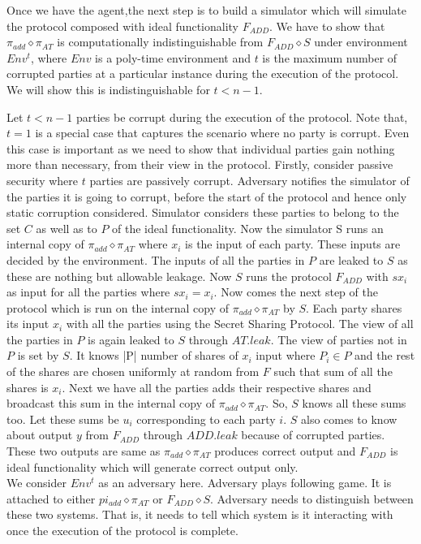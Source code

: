 \documentclass{llncs}
\begin{document}
Once we have the agent,the next step is to build a simulator which will simulate the protocol composed with ideal functionality $F_{ADD}$. We have to show that $\pi_{add} \diamond \pi_{AT}$ is computationally indistinguishable from $F_{ADD} \diamond S$ under environment $Env^t$, where $Env$ is a poly-time environment and $t$ is the maximum number of corrupted parties at a particular instance during the execution of the protocol. We will show this is indistinguishable for $t < n-1$. 

Let $t < n-1$ parties be corrupt during the execution of the protocol. Note that, $t=1$ is a special case that captures the scenario where no party is corrupt. Even this case is important as we need to show that individual parties gain nothing more than necessary, from their view in the protocol. Firstly, consider passive security where $t$ parties are passively corrupt. Adversary notifies the simulator of the parties it is going to corrupt, before the start of the protocol and hence only static corruption considered. Simulator considers these parties to belong to the set $C$ as well as to $P$ of the ideal functionality. Now the simulator S runs an internal copy of $\pi_{add} \diamond \pi_{AT}$ where $x_i$ is the input of each party. These inputs are decided by the environment. The inputs of all the parties in $P$ are leaked to $S$ as these are nothing but allowable leakage. Now $S$ runs the protocol $F_{ADD}$ with $sx_i$ as input for all the parties where $sx_i = x_i$.
Now comes the next step of the protocol which is run on the internal copy of $\pi_{add} \diamond \pi_{AT}$ by $S$. Each party shares its input $x_i$ with all the parties using the Secret Sharing Protocol. The view of all the parties in $P$ is again leaked to $S$ through $AT.leak$. The view of parties not in $P$ is set by $S$. It knows |P| number of shares of $x_i$ input where $P_i \in P$ and the rest of the shares are chosen uniformly at random from $F$ such that sum of all the shares is $x_i$. Next we have all the parties adds their respective shares and broadcast this sum in the internal copy of $\pi_{add} \diamond \pi_{AT}$. So, $S$ knows all these sums too. Let these sums be $u_i$ corresponding to each party $i$. $S$ also comes to know about output $y$ from $F_{ADD}$ through $ADD.leak$ because of corrupted parties. These two outputs are same as $\pi_{add} \diamond \pi_{AT}$ produces correct output and $F_{ADD}$ is ideal functionality which will generate correct output only.\\ 
We consider $Env^t$ as an adversary here. Adversary plays following game. It is attached to either $pi_{add} \diamond \pi_{AT}$ or $F_{ADD} \diamond S$. Adversary needs to distinguish between these two systems. That is, it needs to tell which system is it interacting with once the execution of the protocol is complete.\\
\end{document}
